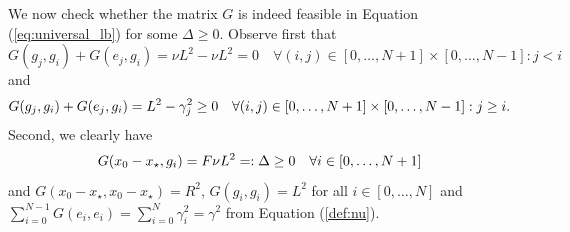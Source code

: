 \documentclass{article}
\begin{document}
\begin{appendixproof}
We now check whether the matrix $G$ is indeed feasible in Equation (\ref{eq:universal_lb}) for some $\Delta\geq 0$. Observe first that
\begin{equation*}
G(g_j, g_i) + G(e_j, g_i)  = \nu L^2- \nu L^2=0 \quad \forall (i, j) \in [0, \dots, N+1]\times [0, \dots, N-1]:  j< i
\end{equation*}
and
\begin{equation*}
  G(g_j, g_i) + G(e_j, g_i) = L^2 - \gamma_j^2 \geq 0 \quad \forall (i, j) \in [0, \dots, N+1]\times [0, \dots, N-1]:  j\geq i.\\
\end{equation*}
Second, we clearly have
\begin{equation*}
 G(x_0-x_\star, g_i)= F \nu L^2 =: \Delta \geq 0 \quad \forall i\in [0, \dots, N+1]\\
\end{equation*}
and $G(x_0-x_\star, x_0-x_\star)= R^2$, $G(g_i, g_i) = L^2$ for all $i\in [0, \dots, N]$ and $\sum_{i=0}^{N-1} G(e_i, e_i) = \sum_{i=0}^N \gamma^2_i = \gamma^2$ from Equation (\ref{def:nu}).


\end{appendixproof}
\end{document}
